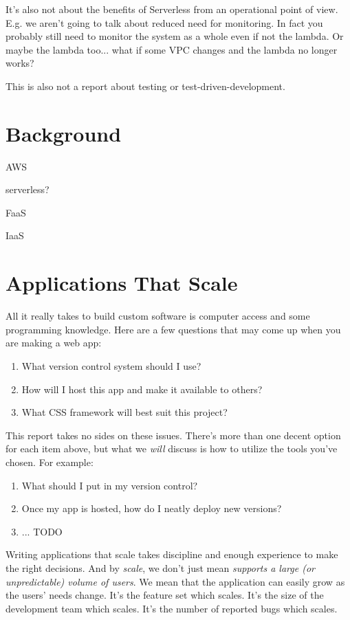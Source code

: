 \documentclass{article}
\newcommand{\term}[1]{\textit{#1}}
\begin{document}
It's also not about the benefits of Serverless from an operational point of view.
E.g. we aren't going to talk about reduced need for monitoring.
In fact you probably still need to monitor the system as a whole even if not the lambda.
Or maybe the lambda too... what if some VPC changes and the lambda no longer works?

This is also not a report about testing or test-driven-development.


\section{Background}

AWS

serverless?

FaaS

IaaS

\section{Applications That Scale}

All it really takes to build custom software is computer access and some programming knowledge.
Here are a few questions that may come up when you are making a web app:

\begin{enumerate}
  \item What version control system should I use?
  \item How will I host this app and make it available to others?
  \item What CSS framework will best suit this project?
\end{enumerate}

This report takes no sides on these issues.
There's more than one decent option for each item above, but what we \textit{will} discuss is how to utilize the tools you've chosen.
For example:

\begin{enumerate}
  \item What should I put in my version control?
  \item Once my app is hosted, how do I neatly deploy new versions?
  \item ... TODO
\end{enumerate}
Writing applications that scale takes discipline and enough experience to make the right decisions.
And by \term{scale}, we don't just mean \term{supports a large (or unpredictable) volume of users}.
We mean that the application can easily grow as the users' needs change.
It's the feature set which scales.
It's the size of the development team which scales.
It's the number of reported bugs which scales.
\end{document}

